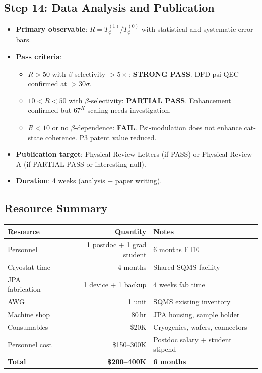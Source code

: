 \documentclass[11pt]{article}
\theoremstyle{definition}
\theoremstyle{remark}
\begin{document}
\subsection{Step 14: Data Analysis and Publication}

\begin{itemize}[nosep]
\item \textbf{Primary observable}: $R = T_\phi^{(1)}/T_\phi^{(0)}$ with
  statistical and systematic error bars.
\item \textbf{Pass criteria}:
  \begin{itemize}[nosep]
  \item $R > 50$ with $\beta$-selectivity $> 5\times$: \textbf{STRONG PASS}.
    DFD psi-QEC confirmed at $> 30\sigma$.
  \item $10 < R < 50$ with $\beta$-selectivity: \textbf{PARTIAL PASS}.
    Enhancement confirmed but $67^K$ scaling needs investigation.
  \item $R < 10$ or no $\beta$-dependence: \textbf{FAIL}. Psi-modulation
    does not enhance cat-state coherence. P3 patent value reduced.
  \end{itemize}
\item \textbf{Publication target}: Physical Review Letters (if PASS)
  or Physical Review A (if PARTIAL PASS or interesting null).
\item \textbf{Duration}: 4 weeks (analysis + paper writing).
\end{itemize}

\subsection{Resource Summary}

\begin{center}
\begin{tabular}{@{}lrl@{}}
\toprule
\textbf{Resource} & \textbf{Quantity} & \textbf{Notes} \\
\midrule
Personnel & 1 postdoc + 1 grad student & 6 months FTE \\
Cryostat time & 4 months & Shared SQMS facility \\
JPA fabrication & 1 device + 1 backup & 4 weeks fab time \\
AWG & 1 unit & SQMS existing inventory \\
Machine shop & 80\,hr & JPA housing, sample holder \\
Consumables & \$20K & Cryogenics, wafers, connectors \\
Personnel cost & \$150--300K & Postdoc salary + student stipend \\
\midrule
\textbf{Total} & \textbf{\$200--400K} & \textbf{6 months} \\
\bottomrule
\end{tabular}
\end{center}
\end{document}
